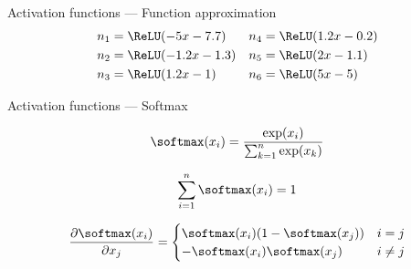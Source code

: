 \begin{frame}{Activation functions --- Function approximation}
  \centering
  {\small
    \begin{align*}
      n_1 & = \ReLU(-5x - 7.7) & n_4 & = \ReLU(1.2x - 0.2) \\
      n_2 & = \ReLU(-1.2x - 1.3) & n_5 & = \ReLU(2x - 1.1) \\
      n_3 & = \ReLU(1.2x - 1) & n_6 & = \ReLU(5x - 5) \\
    \end{align*}
  }
\end{frame}

\begin{frame}{Activation functions --- Softmax}
  \begin{description}[<+->]
    \item[Definition] \[\softmax(x_i) = \frac{\exp(x_i)}{\sum_{k = 1}^n{\exp(x_k)}}\]
    \item[Key property] \[\sum_{i = 1}^n{\softmax(x_i)} = 1\]
    \item[Gradient] \[
      \frac{\partial \softmax(x_i)}{\partial x_j} =
        \begin{cases}
          \softmax(x_i)(1 - \softmax(x_j)) & i = j \\
          -\softmax(x_i)\softmax(x_j) & i \neq j
        \end{cases}
      \]
  \end{description}
  
\end{frame}
